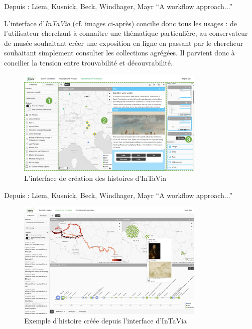 \begin{center}
	Depuis : Liem, Kusnick, Beck, Windhager, Mayr \enquote{A workflow approach...}
\end{center}

L’interface d’\textit{InTaVia} (cf. images ci-après) concilie donc tous les usages : de l’utilisateur cherchant à connaitre une thématique particulière, au conservateur de musée souhaitant créer une exposition en ligne en passant par le chercheur souhaitant simplement consulter les collections agrégées. Il parvient donc à concilier la tension entre trouvabilité et découvrabilité.


\begin{figure}[h!]
	\centering
	\includegraphics[width=0.8\textwidth]{images/image19.png}
	\caption{L’interface de création des histoires d'InTaVia}
	\label{fig:image19}
\end{figure}

\begin{center}
	Depuis : Liem, Kusnick, Beck, Windhager, Mayr \enquote{A workflow approach...}
\end{center}




\begin{figure}[h!]
	\centering
	\includegraphics[width=0.8\textwidth]{images/image20.png}
	\caption{Exemple d'histoire créée depuis l'interface d'InTaVia}
	\label{fig:image20}
\end{figure}


